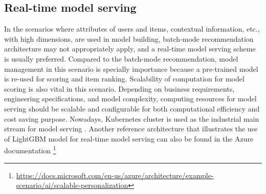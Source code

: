 \subsection{Real-time model serving}
In the scenarios where attributes of users and items, contextual information, etc., with high dimensions, are used in model building, batch-mode recommendation architecture may not appropriately apply, and a real-time model serving scheme is usually preferred. Compared to the batch-mode recommendation, model management in this scenario is specially importance because a pre-trained model is re-used for scoring and item ranking. Scalability of computation for model scoring is also vital in this scenario. Depending on business requirements, engineering specifications, and model complexity, computing resources for model serving should be scalable and configurable for both computational efficiency and cost saving purpose. Nowadays, Kubernetes cluster is used as the industrial main stream for model serving \cite{bernstein2014containers}. Another reference architecture that illustrates the use of LightGBM model \cite{ke2017lightgbm} for real-time model serving can also be found in the Azure documentation \footnote{\url{https://docs.microsoft.com/en-us/azure/architecture/example-scenario/ai/scalable-personalization}}


